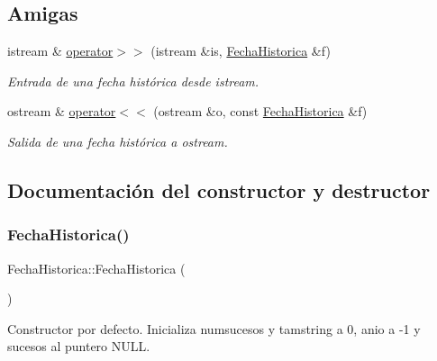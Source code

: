 \subsection*{Amigas}
\begin{DoxyCompactItemize}
\item 
istream \& \hyperlink{classFechaHistorica_a25a93d162aadd3c52aa1f3d1831e3d75}{operator$>$$>$} (istream \&is, \hyperlink{classFechaHistorica}{Fecha\+Historica} \&f)
\begin{DoxyCompactList}\small\item\em Entrada de una fecha histórica desde istream. \end{DoxyCompactList}\item 
ostream \& \hyperlink{classFechaHistorica_a5d5e8ff6e1e1f5fe49529f665e2fe5c7}{operator$<$$<$} (ostream \&o, const \hyperlink{classFechaHistorica}{Fecha\+Historica} \&f)
\begin{DoxyCompactList}\small\item\em Salida de una fecha histórica a ostream. \end{DoxyCompactList}\end{DoxyCompactItemize}


\subsection{Documentación del constructor y destructor}
\mbox{\label{classFechaHistorica_a35baa09e365240e567049a7e33a7c209}} 
\subsubsection{\texorpdfstring{Fecha\+Historica()}{FechaHistorica()}\hspace{0.1cm}{\footnotesize\ttfamily [1/4]}}
{\footnotesize\ttfamily Fecha\+Historica\+::\+Fecha\+Historica (\begin{DoxyParamCaption}{ }\end{DoxyParamCaption})}



Constructor por defecto. Inicializa numsucesos y tamstring a 0, anio a -\/1 y sucesos al puntero N\+U\+LL. 

\mbox{\label{classFechaHistorica_a3004213c2f6e02a621bf5e0a1b438779}} 
